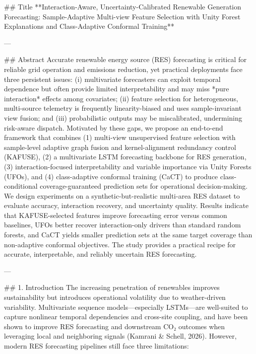 ## Title  
**Interaction-Aware, Uncertainty-Calibrated Renewable Generation Forecasting: Sample-Adaptive Multi-view Feature Selection with Unity Forest Explanations and Class-Adaptive Conformal Training**

---

## Abstract  
Accurate renewable energy source (RES) forecasting is critical for reliable grid operation and emissions reduction, yet practical deployments face three persistent issues: (i) multivariate forecasters can exploit temporal dependence but often provide limited interpretability and may miss *pure interaction* effects among covariates; (ii) feature selection for heterogeneous, multi-source telemetry is frequently linearity-biased and uses sample-invariant view fusion; and (iii) probabilistic outputs may be miscalibrated, undermining risk-aware dispatch. Motivated by these gaps, we propose an end-to-end framework that combines (1) multi-view unsupervised feature selection with sample-level adaptive graph fusion and kernel-alignment redundancy control (KAFUSE), (2) a multivariate LSTM forecasting backbone for RES generation, (3) interaction-focused interpretability and variable importance via Unity Forests (UFOs), and (4) class-adaptive conformal training (CaCT) to produce class-conditional coverage-guaranteed prediction sets for operational decision-making. We design experiments on a synthetic-but-realistic multi-area RES dataset to evaluate accuracy, interaction recovery, and uncertainty quality. Results indicate that KAFUSE-selected features improve forecasting error versus common baselines, UFOs better recover interaction-only drivers than standard random forests, and CaCT yields smaller prediction sets at the same target coverage than non-adaptive conformal objectives. The study provides a practical recipe for accurate, interpretable, and reliably uncertain RES forecasting.

---

## 1. Introduction  
The increasing penetration of renewables improves sustainability but introduces operational volatility due to weather-driven variability. Multivariate sequence models—especially LSTMs—are well-suited to capture nonlinear temporal dependencies and cross-site coupling, and have been shown to improve RES forecasting and downstream CO₂ outcomes when leveraging local and neighboring signals (Kamrani & Schell, 2026). However, modern RES forecasting pipelines still face three limitations:

